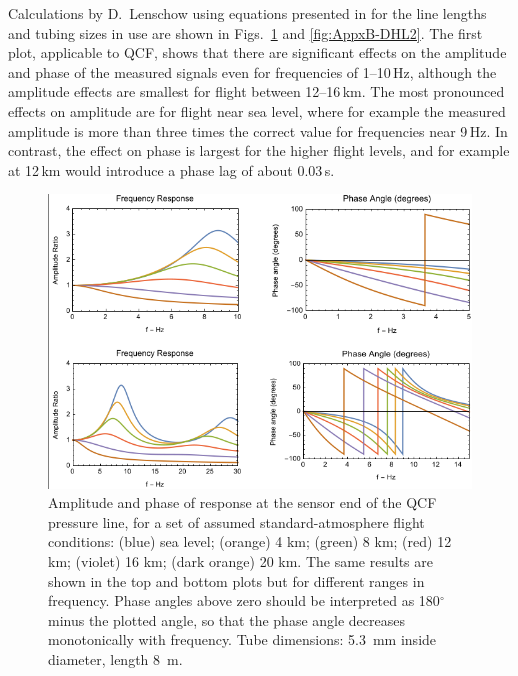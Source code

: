 \documentclass[12pt,twoside,english]{article}\usepackage[]{graphicx}\usepackage[]{color}
\begin{document}
Calculations by D.~Lenschow using equations presented in \citet{Iberall1950} for the line lengths and tubing sizes in use are shown in Figs.~\ref{fig:AppxB-DHL1} and \ref{fig:AppxB-DHL2}. The first plot, applicable to QCF, shows that there are significant effects on the amplitude and phase of the measured signals even for frequencies of 1--10\,Hz, although the amplitude effects are smallest for flight between 12--16\,km. The most pronounced effects on amplitude are for flight near sea level, where for example the measured amplitude is more than three times the correct value for frequencies near 9\,Hz. In contrast, the effect on phase is largest for the higher flight levels, and for example at 12\,km would introduce a phase lag of about 0.03\,s. 
\begin{figure}
\noindent \begin{centering}
\includegraphics[height=0.4\textheight]{SpecialGraphics/PressureLines1.png}  
\par\end{centering}

\protect\caption[Amplitude ratio and phase for transmission through the QCF pressure line.]{\label{fig:AppxB-DHL1}Amplitude and phase of response at the sensor end of the QCF pressure line, for a set of assumed standard-atmosphere flight conditions: (blue) sea level; (orange) 4 km; (green) 8 km; (red) 12 km; (violet) 16 km; (dark orange) 20 km. The same results are shown in the top and bottom plots but for different ranges in frequency. Phase angles above zero should be interpreted as 180$^{\circ}$ minus the plotted angle, so that the phase angle decreases monotonically with frequency. Tube dimensions: 5.3~mm inside diameter, length 8~m. } 
\end{figure}
\end{document}
